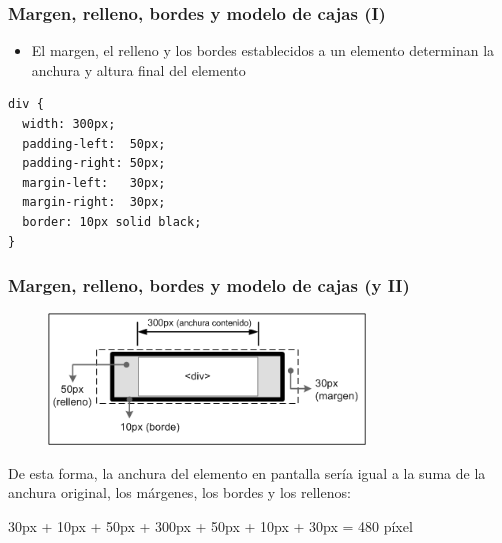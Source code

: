 \documentclass[ucs]{beamer}
\begin{document}

\begin{frame}[fragile]
\frametitle{Margen, relleno, bordes y modelo de cajas (I)}

\begin{itemize}
  \item El margen, el relleno y los bordes establecidos a un elemento determinan la anchura y altura final del elemento
\end{itemize}

{\footnotesize
\begin{verbatim}
div {
  width: 300px;
  padding-left:  50px;
  padding-right: 50px;
  margin-left:   30px;
  margin-right:  30px;
  border: 10px solid black;
}
\end{verbatim}
}



\end{frame}


\begin{frame}[fragile]
\frametitle{Margen, relleno, bordes y modelo de cajas (y II)}

\begin{center}
\begin{figure}[p]
\includegraphics[width=0.75\textwidth]{figs/f0414.png}
\end{figure}
\end{center}

De esta forma, la anchura del elemento en pantalla sería igual a la suma de la anchura original, los márgenes, los bordes y los rellenos:

30px + 10px + 50px + 300px + 50px + 10px + 30px = 480 píxel

\end{frame}

\end{document}
